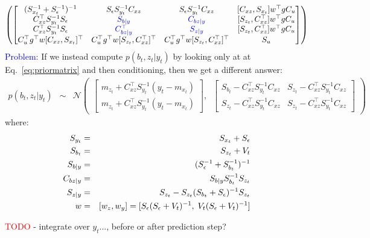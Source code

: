 \documentclass[9pt]{article}
\newcommand{\N}{\mathcal{N}}
\newcommand{\m}[1]{m_{#1}}                  %
\newcommand{\s}[1]{S_{#1}}                  %
\newcommand{\Sn}{\s{\epsilon}}              %
\newcommand{\now}[1]{#1_t}                  %
\newcommand{\pno}[1]{#1_{t}}  %
\newcommand{\inv}{^{-1}}
\newcommand{\nnn}{\nonumber \\}
\newcommand{\nn}{\nonumber}
\newcommand{\red}[1]{\textcolor{red}{#1}}
\newcommand{\blue}[1]{\textcolor{blue}{#1}}
\begin{document}
{{\begin{eqnarray}
\begin{pmatrix}
 \begin{bmatrix}
 (\s{\now{x}}\inv + \Sn\inv)\inv & \Sn\s{\now{y}}\inv C_{xz} & \Sn\s{\now{y}}\inv C_{xz} & [C_{xz},\s{\now{x}}]w^\top gC_{u}       \\
 C_{xz}^\top\s{\now{y}}\inv\Sn   & \blue{\s{b|y}}            & \blue{\CbzGy}             & [\s{\pno{z}}, C_{xz}^\top]w^\top gC_{u} \\
 C_{xz}^\top\s{\now{y}}\inv\Sn   & \blue{\CbzGy^\top}        & \blue{\s{z|y}}            & [\s{\pno{z}}, C_{xz}^\top]w^\top gC_{u} \\
 C_{u}^\top g^\top w [C_{xz},\s{\now{x}}]^\top &  C_{u}^\top g^\top w [\s{\pno{z}}, C_{xz}^\top]^\top &  C_{u}^\top g^\top w [\s{\pno{z}}, C_{xz}^\top]^\top & \s{u} \end{bmatrix} \end{pmatrix} \nn
\end{eqnarray}
%
\blue{Problem}: If we instead compute $p(\pno{b},\pno{z}|\now{y})$ by looking only at at Eq.~\ref{eq:priormatrix} and then conditioning, then we get a different answer:
\begin{eqnarray}
 p(\pno{b},\pno{z}|\now{y})
   &\sim& \N \begin{pmatrix} \begin{bmatrix}
   \m{\pno{z}} + C_{xz}^\top \s{\now{y}}\inv (\now{y} - \m{\now{x}}) \\
   \m{\pno{z}} + C_{xz}^\top \s{\now{y}}\inv (\now{y} - \m{\now{x}}) \end{bmatrix}, \;\;
   \begin{bmatrix}
   \s{\pno{b}} - C_{xz}^\top\s{\now{y}}\inv C_{xz} &
   \s{\pno{z}} - C_{xz}^\top \s{\now{y}}\inv C_{xz} \\
   \s{\pno{z}} - C_{xz}^\top \s{\now{y}}\inv C_{xz}  &
   \s{\pno{z}} - C_{xz}^\top \s{\now{y}}\inv C_{xz} \end{bmatrix} \end{pmatrix}
\end{eqnarray}
%
where:
\begin{eqnarray}
 \s{\now{y}} &=& \s{\now{x}}+\Sn \nnn
 \s{\pno{b}} &=& \s{\pno{z}}+\pno{V} \nnn
 \s{b|y} &=& (\Sn\inv+\s{\pno{b}}\inv)\inv \nnn
 \CbzGy &=& \s{b|y} \s{\pno{b}}\inv \s{\pno{z}} \nnn
 \s{z|y} &=& \s{\pno{z}}-\s{\pno{z}} (\s{\pno{b}}+\Sn)\inv \s{\pno{z}} \nnn
 w &=& [w_z,w_y] = [\Sn(\Sn+\pno{V})\inv, \; \pno{V}(\Sn+\pno{V})\inv] \nn
\end{eqnarray}
}}

\medskip\noindent
\red{TODO} - integrate over $\now{y}$..., before or after prediction step?
\end{document}
